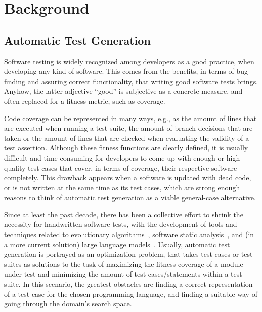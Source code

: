 \documentclass[%
  chapterprefix=false,%
  open=right,%
  twoside=true,%
  paper=a4,%
  logofile={Figures/logo.png},%
  thesistype=master,%
  UKenglish,%
]{se2thesis}
\begin{document}
\chapter{Background}\label{chap:background}

\section{Automatic Test Generation}

Software testing is widely recognized among developers as a good practice, when developing any kind of software.
This comes from the benefits, in terms of bug finding and assuring correct functionality, that writing good software tests brings.
Anyhow, the latter adjective ``good'' is subjective as a concrete measure, and often replaced for a fitness metric, such as coverage.

Code coverage can be represented in many ways, e.g., as the amount of lines that are executed when running a test suite, the amount of branch-decisions that are taken or the amount of lines that are checked when evaluating the validity of a test assertion.
Although these fitness functions are clearly defined, it is usually difficult and time-consuming for developers to come up with enough or high quality test cases that cover, in terms of coverage, their respective software completely.
This drawback appears when a software is updated with dead code, or is not written at the same time as its test cases, which are strong enough reasons to think of automatic test generation as a viable general-case alternative.

Since at least the past decade, there has been a collective effort to shrink the necessity for handwritten software tests, with the development of tools and techniques related to evolutionary algorithms~\cite{DBLP:conf/sigsoft/FraserA11}, software static analysis~\cite{DBLP:conf/osdi/CadarDE08}, and (in a more current solution) large language models~\cite{DBLP:journals/corr/abs-2207-10397}.
Usually, automatic test generation is portrayed as an optimization problem, that takes test cases or test suites as solutions to the task of maximizing the fitness coverage of a module under test and minimizing the amount of test cases/statements within a test suite.
In this scenario, the greatest obstacles are finding a correct representation of a test case for the chosen programming language, and finding a suitable way of going through the domain's search space.

\newpage
\end{document}
